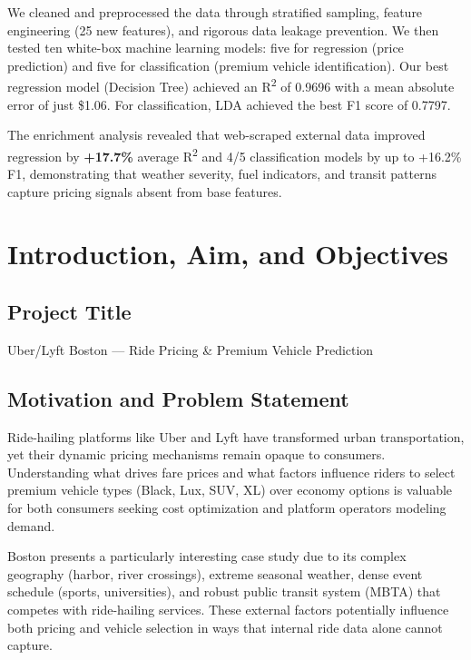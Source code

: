 \documentclass[12pt,a4paper]{article}
\begin{document}
We cleaned and preprocessed the data through stratified sampling, feature engineering (25 new features), and rigorous data leakage prevention. We then tested ten white-box machine learning models: five for regression (price prediction) and five for classification (premium vehicle identification). Our best regression model (Decision Tree) achieved an R\textsuperscript{2} of 0.9696 with a mean absolute error of just \$1.06. For classification, LDA achieved the best F1 score of 0.7797.

The enrichment analysis revealed that web-scraped external data improved regression by \textbf{+17.7\%} average R\textsuperscript{2} and 4/5 classification models by up to +16.2\% F1, demonstrating that weather severity, fuel indicators, and transit patterns capture pricing signals absent from base features.

\newpage

\section{Introduction, Aim, and Objectives}

\subsection{Project Title}
Uber/Lyft Boston --- Ride Pricing \& Premium Vehicle Prediction

\subsection{Motivation and Problem Statement}
Ride-hailing platforms like Uber and Lyft have transformed urban transportation, yet their dynamic pricing mechanisms remain opaque to consumers. Understanding what drives fare prices and what factors influence riders to select premium vehicle types (Black, Lux, SUV, XL) over economy options is valuable for both consumers seeking cost optimization and platform operators modeling demand.

Boston presents a particularly interesting case study due to its complex geography (harbor, river crossings), extreme seasonal weather, dense event schedule (sports, universities), and robust public transit system (MBTA) that competes with ride-hailing services. These external factors potentially influence both pricing and vehicle selection in ways that internal ride data alone cannot capture.
\end{document}
